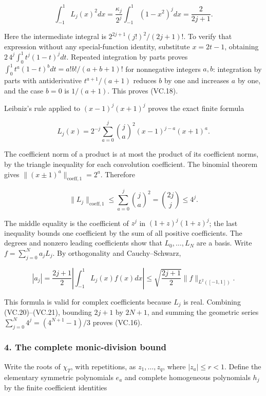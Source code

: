 \[
 \int_{-1}^1L_j(x)^2dx
 =\frac{\kappa_j}{2^j}\int_{-1}^1(1-x^2)^jdx
 =\frac{2}{2j+1}.
\tag{VC.18}
\]

Here the intermediate integral is \(2^{2j+1}(j!)^2/(2j+1)!\). To verify that expression without any special-function identity, substitute \(x=2t-1\), obtaining \(2\,4^j\int_0^1t^j(1-t)^jdt\). Repeated integration by parts proves \(\int_0^1t^a(1-t)^bdt=a!b!/(a+b+1)!\) for nonnegative integers \(a,b\): integration by parts with antiderivative \(t^{a+1}/(a+1)\) reduces \(b\) by one and increases \(a\) by one, and the case \(b=0\) is \(1/(a+1)\). This proves (VC.18).

Leibniz's rule applied to \((x-1)^j(x+1)^j\) proves the exact finite formula

\[
 L_j(x)=2^{-j}\sum_{a=0}^j\binom ja^2
                           (x-1)^{j-a}(x+1)^a.
\tag{VC.19}
\]

The coefficient norm of a product is at most the product of its coefficient norms, by the triangle inequality for each convolution coefficient. The binomial theorem gives \(\|(x\pm1)^a\|_{\mathrm{coeff},1}=2^a\). Therefore

\[
 \|L_j\|_{\mathrm{coeff},1}\le\sum_{a=0}^j\binom ja^2
 =\binom{2j}{j}\le4^j.
\tag{VC.20}
\]

The middle equality is the coefficient of \(z^j\) in \((1+z)^j(1+z)^j\); the last inequality bounds one coefficient by the sum of all positive coefficients. The degrees and nonzero leading coefficients show that \(L_0,\ldots,L_N\) are a basis. Write \(f=\sum_{j=0}^Na_jL_j\). By orthogonality and Cauchy--Schwarz,

\[
 |a_j|=\frac{2j+1}{2}\left|\int_{-1}^1 L_j(x)f(x)dx\right|
 \le\sqrt{\frac{2j+1}{2}}\|f\|_{L^2([-1,1])}.
\tag{VC.21}
\]

This formula is valid for complex coefficients because \(L_j\) is real. Combining (VC.20)--(VC.21), bounding \(2j+1\) by \(2N+1\), and summing the geometric series \(\sum_{j=0}^N4^j=(4^{N+1}-1)/3\) proves (VC.16).

\subsubsection{4. The complete monic-division bound}\label{endpoint-volume_connection_original--the-complete-monic-division-bound}

Write the roots of \(\chi_T\), with repetitions, as \(z_1,\ldots,z_q\), where \(|z_a|\le r<1\). Define the elementary symmetric polynomials \(e_a\) and complete homogeneous polynomials \(h_j\) by the finite coefficient identities


